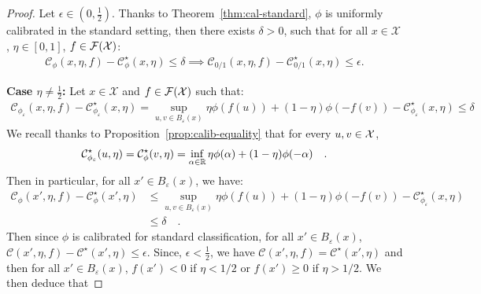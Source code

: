 \begin{proof}

    Let $\epsilon\in(0,\frac{1}{2})$. Thanks to Theorem~\ref{thm:cal-standard}, $\phi$ is uniformly calibrated in the standard setting, then there exists $\delta>0$, such that for all $x\in\mathcal{X}$, $\eta\in [0,1]$, $f\in \mathcal{F}(\mathcal{X})$:
    \begin{align*}
        \mathcal{C}_\phi(x,\eta,f) - \mathcal{C}_\phi^\star(x,\eta)\leq \delta \implies \mathcal{C}_{0/1}(x,\eta,f) - \mathcal{C}_{0/1}^\star(x,\eta)\leq \epsilon.
    \end{align*}
    
    
    \textbf{Case $\eta\neq \frac12$:} Let $x\in\mathcal{X}$ and $f\in \mathcal{F}(\mathcal{X})$ such that: 
    \begin{align*}
    \mathcal{C}_{\phi_\varepsilon}(x,\eta,f) - \mathcal{C}_{\phi_\varepsilon}^\star(x,\eta)
     = \sup_{u,v\in B_\varepsilon(x)}\eta\phi (f(u))+(1-\eta)\phi (-f(v))-\mathcal{C}_{\phi_\varepsilon}^\star(x,\eta)\leq \delta 
    \end{align*}
    We recall thanks to Proposition~\ref{prop:calib-equality} that for every $u,v\in\mathcal{X}$,
\begin{align*}
    \mathcal{C}_{\phi_\varepsilon}^\star(u,\eta) =\mathcal{C}_\phi^\star(v,\eta)=\inf_{\alpha\in\mathbb{R}}\eta \phi(\alpha)+(1-\eta)\phi(-\alpha)\quad.  
\end{align*}
 Then in particular, for all $x'\in B_\varepsilon(x)$, we have:
    \begin{align*}
        \mathcal{C}_{\phi}(x',\eta,f) - \mathcal{C}_{\phi}^\star(x',\eta)&\leq \sup_{u,v\in B_\varepsilon(x)}\eta\phi (f(u))+(1-\eta)\phi (-f(v))-\mathcal{C}_{\phi_\varepsilon}^\star(x,\eta)\\
        &\leq \delta\quad.
    \end{align*} 
    Then since $\phi$ is calibrated for standard classification, for all $x'\in B_\varepsilon(x)$, $\mathcal{C}(x',\eta,f) - \mathcal{C}^\star(x',\eta)\leq \epsilon$. Since,  $\epsilon<\frac{1}{2}$, we have $\mathcal{C}(x',\eta,f) = \mathcal{C}^\star(x',\eta)$ and then for all $x'\in B_\varepsilon(x)$, $f(x')< 0$  if $\eta<1/2$ or $f(x')\geq0$  if $\eta>1/2$. We then deduce that 
    

\end{proof}
